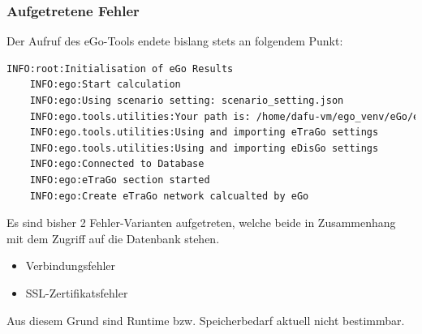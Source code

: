 \documentclass[
a4paper,     %
12pt         %
]{scrartcl}  %
\begin{document}
\subsubsection{Aufgetretene Fehler}
Der Aufruf des eGo-Tools endete bislang stets an folgendem Punkt:
\begin{lstlisting}[language=bash]
	INFO:root:Initialisation of eGo Results
	INFO:ego:Start calculation
	INFO:ego:Using scenario setting: scenario_setting.json
	INFO:ego.tools.utilities:Your path is: /home/dafu-vm/ego_venv/eGo/ego
	INFO:ego.tools.utilities:Using and importing eTraGo settings
	INFO:ego.tools.utilities:Using and importing eDisGo settings
	INFO:ego:Connected to Database
	INFO:ego:eTraGo section started
	INFO:ego:Create eTraGo network calcualted by eGo
\end{lstlisting}

Es sind bisher 2 Fehler-Varianten aufgetreten, welche beide in Zusammenhang mit dem Zugriff auf die Datenbank stehen.
\begin{itemize}
	\item Verbindungsfehler
	\item SSL-Zertifikatsfehler
\end{itemize}
Aus diesem Grund sind Runtime bzw. Speicherbedarf aktuell nicht bestimmbar.\\
\end{document}
